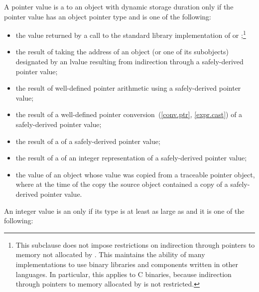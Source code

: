 \pnum
A pointer value is a  to an object with dynamic storage duration
only if the pointer value has an object pointer type
and is one of the following:
\begin{itemize}
\item the value returned by a call to the \Cpp{} standard library implementation of
 or
%
;\footnote{This subclause does not impose restrictions
on indirection through pointers to memory not allocated by . This
maintains the ability of many \Cpp{} implementations to use binary libraries and
components written in other languages. In particular, this applies to C binaries,
because indirection through pointers to memory allocated by  is not restricted.}

\item the result of taking the address of an object (or one of its
  subobjects) designated by an lvalue resulting from indirection
  through a safely-derived pointer value;

\item the result of well-defined pointer arithmetic using a safely-derived pointer
value;

\item the result of a well-defined pointer
conversion~(\ref{conv.ptr}, \ref{expr.cast}) of a safely-derived pointer value;

\item the result of a  of a safely-derived pointer value;

\item the result of a  of an integer representation of a
safely-derived pointer value;

\item the value of an object whose value was copied from a traceable pointer object,
where at the time of the copy the source object contained a copy of a safely-derived
pointer value.
\end{itemize}

\pnum
{}%
%
An integer value is an 
only if its type is at least as large as  and it is one of the
following:

